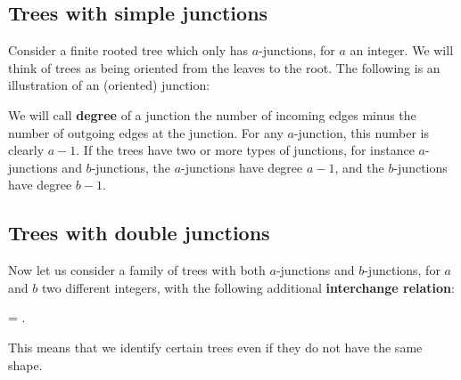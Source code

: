 \documentclass[12pt]{amsart}
\newcommand\Bseries[1]{\Forest{Bseries #1}}
\theoremstyle{plain}
\theoremstyle{definition}
\theoremstyle{remark}
\begin{document}
\subsection{Trees with simple junctions}
Consider a finite rooted tree which only has $a$-junctions, for $a$ an integer.
We will think of trees as being oriented from the leaves to the root.
The following is an illustration of an (oriented) junction:
\begin{center}
\end{center}
We will call \textbf{degree} of a junction the number of incoming edges minus the number of outgoing edges at the junction.
For any $a$-junction, this number is clearly $a-1$.
If the trees have two or more types of junctions, for instance $a$-junctions and $b$-junctions,
the $a$-junctions have degree $a-1$, and the $b$-junctions have degree $b-1$.

\subsection{Trees with double junctions}

Now let us consider a family of trees with both $a$-junctions and $b$-junctions, for $a$ and $b$ two different integers, 
with the following additional \textbf{interchange relation}:
\begin{center}
  \Bseries{[[, edge = orange,[, edge = purple][, edge = purple]][, edge = orange,[, edge = purple][, edge = purple]][,edge = orange,[, edge = purple][, edge = purple]]]} = \Bseries{[[, edge = purple,[, edge = orange][, edge = orange][, edge = orange]][, edge = purple,[, edge = orange][, edge = orange][, edge = orange]]]}.
\end{center} 
This means that we identify certain trees even if they do not have the same shape.
\end{document}
